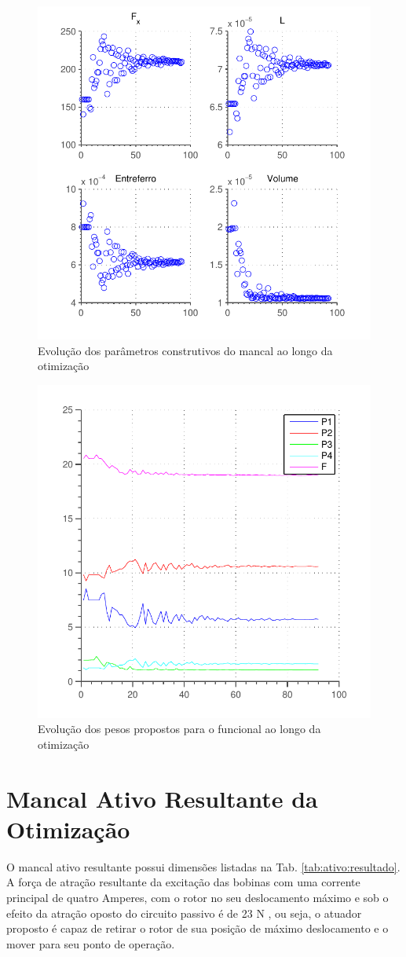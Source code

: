 \begin{figure}[ht!]
	\centering
	\includegraphics[width=0.6\linewidth]{Figs/Simulacoes/Ativo/otimizacao_ativo_parametros}
	\caption{Evolução dos parâmetros construtivos do mancal ao longo da otimização}
	\label{fig:otimizacao_ativo_parametros}
\end{figure}

\begin{figure}[ht!]
\centering
\includegraphics[width=0.6\linewidth]{Figs/Simulacoes/Ativo/otimizacao_ativo_pesos}
\caption{Evolução dos pesos propostos para o funcional ao longo da otimização}
\label{fig:otimizacao_ativo_pesos}
\end{figure}


\section{Mancal Ativo Resultante da Otimização}

O mancal ativo resultante possui dimensões listadas na Tab. \ref{tab:ativo:resultado}. A força de atração resultante da excitação das bobinas com uma corrente principal de quatro Amperes, com o rotor no seu deslocamento máximo e sob o efeito da atração oposto do circuito passivo é de 23 N , ou seja, o atuador proposto é capaz de retirar o rotor de sua posição de máximo deslocamento e o mover para seu ponto de operação.

